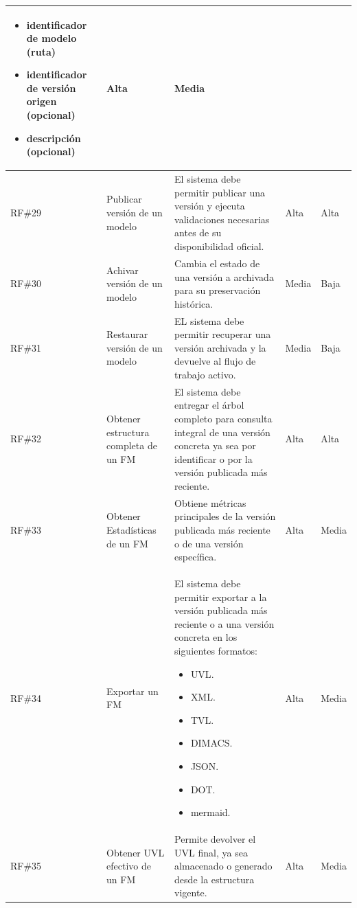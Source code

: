 \begin{longtable}{|p{1cm}|p{4cm}|p{5.2cm}|p{1.9cm}|p{1.9cm}|}
		\begin{itemize}
			\item identificador de modelo (ruta)
			\item identificador de versión origen (opcional)
			\item descripción (opcional)
		\end{itemize}
	& Alta & Media \\
	\hline
	\rowcolor[HTML]{EDEBF1}
	\ac{RF}\#29 & Publicar versión de un modelo & El sistema debe permitir publicar una versión y ejecuta validaciones necesarias antes de su disponibilidad oficial. & Alta & Alta \\
	\hline
	\ac{RF}\#30 & Achivar versión de un modelo & Cambia el estado de una versión a archivada para su preservación histórica. & Media & Baja \\
	\hline
	\rowcolor[HTML]{EDEBF1}
	\ac{RF}\#31 & Restaurar versión de un modelo & EL sistema debe permitir recuperar una versión archivada y la devuelve al flujo de trabajo activo. & Media & Baja \\
	\hline
	\ac{RF}\#32 & Obtener estructura completa de un \ac{FM} & El sistema debe entregar el árbol completo para consulta integral de una versión concreta ya sea por identificar o por la versión publicada más reciente. & Alta & Alta \\
	\hline
    \rowcolor[HTML]{EDEBF1}
	\ac{RF}\#33 & Obtener Estadísticas de un \ac{FM} & Obtiene métricas principales de la versión publicada más reciente o de una versión específica. & Alta & Media \\
	\hline
	\ac{RF}\#34 & Exportar un \ac{FM} & El sistema debe permitir exportar a la versión publicada más reciente o a una versión concreta en los siguientes formatos: 
		\begin{itemize}
				\item \ac{UVL}.
				\item \ac{XML}.
				\item \ac{TVL}.
				\item \ac{DIMACS}.
				\item \ac{JSON}.
				\item \ac{DOT}.
				\item mermaid.
		\end{itemize}
	& Alta & Media \\
	\hline
    \rowcolor[HTML]{EDEBF1}
	\ac{RF}\#35 & Obtener \ac{UVL} efectivo de un \ac{FM} & Permite devolver el \ac{UVL} final, ya sea almacenado o generado desde la estructura vigente. & Alta & Media \\

\end{longtable}
